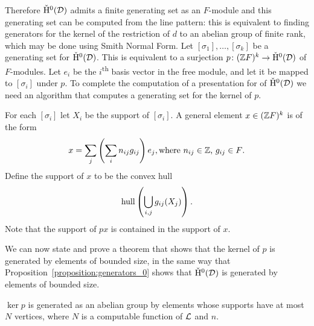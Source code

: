 Therefore $\check{\mathrm{H}}{}^0(\mathcal{D})$ admits a finite generating set as an $F$-module and this generating set can be computed from the line pattern: this is equivalent to finding generators for the kernel of the restriction of $d$ to an abelian group of finite rank, which may be done using Smith Normal Form.
Let $[\sigma_1], \dotsc, [\sigma_k]$ be a generating set for $\check{\mathrm{H}}{}^0(\mathcal{D})$.
This is equivalent to a surjection $p \colon (\mathbb{Z} F)^k \to \check{\mathrm{H}}^0 ( \mathcal{D})$ of $F$-modules.
Let $e_i$ be the $i$\textsuperscript{th} basis vector in the free module, and let it be mapped to $[\sigma_i]$ under $p$.
To complete the computation of a presentation for of $\check{\mathrm{H}}^0(\mathcal{D})$ we need an algorithm that computes a generating set for the kernel of $p$.

For each $[\sigma_i]$ let $X_i$ be the support of $[\sigma_i]$.
A general element $x \in (\mathbb{Z} F)^k$ is of the form
\begin{align}\label{eqn:freemodule}
  x = \sum\limits_j\left(\sum\limits_i n_{ij}g_{ij}\right)e_j, \text{where $n_{ij} \in \mathbb{Z}$, $g_{ij} \in F$}.
\end{align}
Define the support of $x$ to be the convex hull
\begin{align}
  \operatorname{\mathrm{hull}} \left(\bigcup\limits_{i, j} g_{ij}(X_j)\right).
\end{align}
Note that the support of $px$ is contained in the support of $x$.

We can now state and prove a theorem that shows that the kernel of $p$ is generated by elements of bounded size, in the same way that Proposition~\ref{proposition:generators_0} shows that $\check{\mathrm{H}}{}^0(\mathcal{D})$ is generated by elements of bounded size.

\begin{proposition}\label{proposition:relators_0}
  $\ker p$ is generated as an abelian group by elements whose supports have at most $N$ vertices, where $N$ is a computable function of $\mathcal{L}$ and $n$.
\end{proposition}

